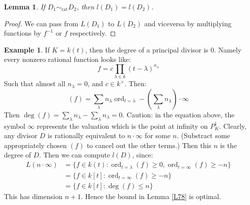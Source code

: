 \documentclass{article}
\DeclareMathOperator{\ord}{ord}
\theoremstyle{plain}
\newtheorem{lem}[thm]{Lemma}
\theoremstyle{definition}
\newtheorem{exmp}{Example}
\theoremstyle{remark}
\begin{document}
\begin{lem}
\label{L79}
If $D_1 \sim_{\text{rat}} D_2$, then $l(D_1) = l(D_2)$.
\end{lem}
\begin{proof}
We can pass from $L(D_1)$ to $L(D_2)$ and viceversa by multiplying functions by $f^{-1}$ or $f$ respectively.
\end{proof}
\begin{exmp}
If $K = k(t)$, then the degree of a principal divisor is 0. Namely every nonzero rational function looks like:
\[       f = c \prod_{\lambda \in k} (t - \lambda)^{n_{\lambda}}       \]
Such that almost all $n_{\lambda} = 0$, and $c\in k^{\times}$. Then:
\[    (f) = \sum_{\lambda} n_{\lambda} \ord_{t=\lambda} - \left( \sum_{\lambda} n_{\lambda}\right) \cdot \infty   \]
Then $\deg(f) = \sum_{\lambda} n_{\lambda} - \sum_{\lambda} n_{\lambda} = 0$. Caution: in the equation above, the symbol $\infty$ represents the valuation which is the point at infinity on $P^1_K$. Clearly, any divisor $D$ is rationally equivalent to $n\cdot \infty$ for some $n$. (Substract some appropriately chosen $(f)$ to cancel out the other terms.) Then this $n$ is the degree of $D$. Then we can compute $l(D)$, since:
\begin{align*}   L(n\cdot \infty) &= \{ f\in k(t) : \ord_{t=\lambda}(f) \geq 0 , \ord_{t=\infty}(f) \geq -n  \}  \\
 &= \{ f \in k[t] : \ord_{t=\infty}(f) \geq -n \} \\
 &= \{ f \in k[t] : \deg(f) \leq n  \}
\end{align*}
This has dimension $n+1$. Hence the bound in Lemma \ref{L78} is optimal.


\end{exmp}
\end{document}
